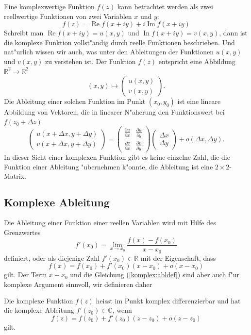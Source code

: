 Eine komplexwertige Funktion $f(z)$ kann betrachtet werden als zwei
reellwertige Funktionen von zwei Variablen $x$ und $y$:
\[
f(z)=\operatorname{Re}f(x+iy) + i \operatorname{Im}f(x+iy)
\]
Schreibt man
$\operatorname{Re}f(x+iy)=u(x,y)$
und
$\operatorname{In}f(x+iy)=v(x,y)$,
dann ist die komplexe Funktion vollst"andig durch reelle Funktionen
beschrieben.
Und nat"urlich wissen wir auch, was unter den Ableitungen der Funktionen 
$u(x,y)$ und $v(x,y)$ zu verstehen ist.
Der Funktion $f(z)$ entspricht eine Abbildung $\mathbb R^2\to\mathbb R^2$
\[
(x,y)\mapsto\begin{pmatrix}u(x,y)\\v(x,y)\end{pmatrix}.
\]
Die Ableitung einer solchen Funktion im Punkt $(x_0,y_0)$
ist eine lineare Abbildung von Vektoren, die in linearer N"aherung
den Funktionswert bei $f(z_0 + \Delta z)$ 
\[
\begin{pmatrix}
u(x+\Delta x, y +\Delta y)\\
v(x+\Delta x, y +\Delta y)
\end{pmatrix}
=
\begin{pmatrix}
\frac{\partial u}{\partial x}&\frac{\partial u}{\partial y}\\
\frac{\partial v}{\partial x}&\frac{\partial v}{\partial y}
\end{pmatrix}
\begin{pmatrix} \Delta x\\\Delta y \end{pmatrix}
+o(\Delta x, \Delta y).
\]
In dieser Sicht einer komplexen Funktion gibt es keine einzelne Zahl, die
die Funktion einer Ableitung "ubernehmen k"onnte, die Ableitung
ist eine $2\times 2$-Matrix.

%
%
\subsection{Komplexe Ableitung}
Die Ableitung einer Funktion einer reellen Variablen wird mit Hilfe des
Grenzwertes
\[
f'(x_0)=\lim_{x\to x_0}\frac{f(x)-f(x_0)}{x-x_0}
\]
definiert, oder als diejenige Zahl $f'(x_0)\in\mathbb R$ mit der Eigenschaft,
dass
\begin{equation}
f(x)=f(x_0)+f'(x_0)(x-x_0) + o(x-x_0)
\label{komplex:abldef}
\end{equation}
gilt.
Der Term $x-x_0$ und die Gleichung (\ref{komplex:abldef}) sind aber auch
f"ur komplexe Argument sinnvoll, wir definieren daher

\begin{definition}
Die komplexe Funktion $f(z)$ heisst im Punkt komplex differenzierbar
und hat die komplexe Ableitung $f'(z_0)\in\mathbb C$,
wenn 
\begin{equation}
f(z)=f(z_0) + f'(z_0)(z-z_0) +o(z-z_0)
\label{komplex:defkomplabl}
\end{equation}
gilt.
\end{definition}

